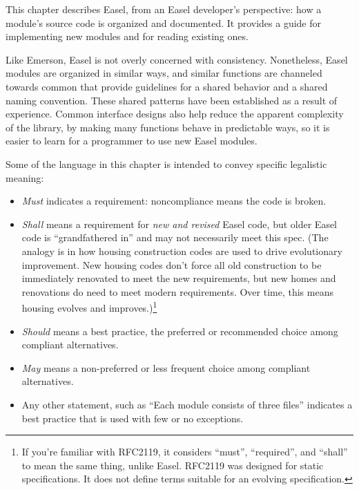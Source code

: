 
This chapter describes Easel, from an Easel developer's perspective:
how a module's source code is organized and documented. It provides a
guide for implementing new modules and for reading existing ones.

Like Emerson, Easel is not overly concerned with
consistency. Nonetheless, Easel modules are organized in similar ways,
and similar functions are channeled towards common 
that provide guidelines for a shared behavior and a shared naming
convention. These shared patterns have been established as a result of
experience. Common interface designs also help reduce the apparent
complexity of the library, by making many functions behave in
predictable ways, so it is easier to learn for a programmer to use new
Easel modules.

Some of the language in this chapter is intended to convey specific
legalistic meaning:

\begin{itemize} 
\item \emph{Must} indicates a requirement: noncompliance means the
code is broken.

\item \emph{Shall} means a requirement for \emph{new and revised}
Easel code, but older Easel code is ``grandfathered in'' and may not
necessarily meet this spec. (The analogy is in how housing
construction codes are used to drive evolutionary improvement. New
housing codes don't force all old construction to be immediately
renovated to meet the new requirements, but new homes and renovations
do need to meet modern requirements. Over time, this means housing
evolves and improves.)\footnote{If you're familiar with RFC2119, it
considers ``must'', ``required'', and ``shall'' to mean the same
thing, unlike Easel. RFC2119 was designed for static
specifications. It does not define terms suitable for an evolving
specification.}

\item \emph{Should} means a best practice, the preferred or
recommended choice among compliant alternatives.

\item \emph{May} means a non-preferred or less frequent choice among
compliant alternatives.

\item Any other statement, such as ``Each module consists of three
files'' indicates a best practice that is used with few or no
exceptions.
\end{itemize}




